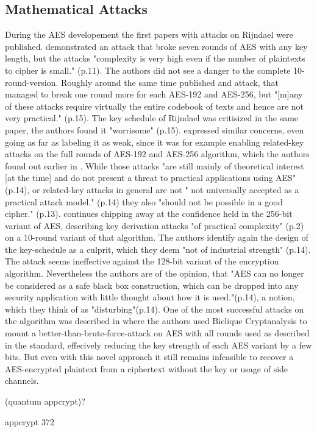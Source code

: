 \subsection{Mathematical Attacks}
\label{ch:mathematicalattacks}

During the AES developement the first papers with attacks on Rijndael were published. \cite{Gilbert00acollision} demonstrated an attack that broke seven rounds of AES with any key length, but the attacks "complexity is very high even if the number of plaintexts to cipher is small." (p.11). The authors did not see a danger to the complete 10-round-version.
Roughly around the same time \cite{impcryptan} published and attack, that managed to break one round more for each AES-192 and AES-256, but "[m]any of these attacks require virtually the entire codebook of texts and hence are not very practical." (p.15).
The key schedule of Rijndael was critisized in the same paper, the authors found it "worrisome" (p.15). \cite{rkeyattack} expressed similar concerns, even going as far as labeling it as weak, since it was for example enabling related-key attacks on the full rounds of AES-192 and AES-256 algorithm, which the authors found out earlier in \cite{rkeyattack2}.  While those attacks "are still mainly of theoretical interest [at the time] and do not present a threat to practical applications using AES" (p.14), or related-key attacks in general are not " not universally accepted as a practical attack model."\cite{rkeyattack3} (p.14) they also "should not be possible in a good cipher." \cite{rkeyattack} (p.13). 
\cite{rkeyattack3} continues chipping away at the confidence held in the 256-bit variant of AES, describing key derivation attacks "of practical complexity" (p.2) on a 10-round variant of that algorithm. The authors identify again the design of the key-schedule as a culprit, which they deem "not of industrial strength" (p.14). The attack seems ineffective against the 128-bit variant of the encryption algorithm. Nevertheless the authors are of the opinion, that "AES can no longer be considered as a safe black box construction, which can be dropped into any security application with little thought about how it is used."(p.14), a notion, which they think of as "disturbing"(p.14).
One of the most successful attacks on the algorithm was described in \cite{biclique} where the authors used Biclique Cryptanalysis to mount a better-than-brute-force-attack on AES with all rounds used as described in the standard, effecively reducing the key strength of each AES variant by a few bits. But even with this novel approach it still remains infeasible to recover a AES-encrypted plaintext from a ciphertext without the key or usage of side channels. 

(quantum appcrypt)?

appcrypt 372
